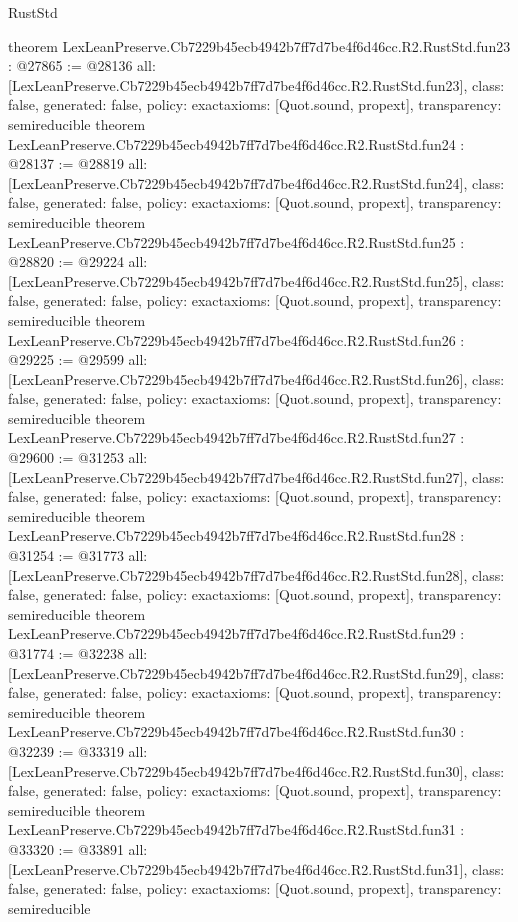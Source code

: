 \begin{lexlean}{RustStd}
\begin{coremodule}
{}
theorem LexLeanPreserve.Cb7229b45ecb4942b7ff7d7be4f6d46cc.R2.RustStd.fun23 : @27865 := @28136 {
  all: [LexLeanPreserve.Cb7229b45ecb4942b7ff7d7be4f6d46cc.R2.RustStd.fun23],
  class: false,
  generated: false,
  policy: exact{axioms: [Quot.sound, propext]},
  transparency: semireducible
}
theorem LexLeanPreserve.Cb7229b45ecb4942b7ff7d7be4f6d46cc.R2.RustStd.fun24 : @28137 := @28819 {
  all: [LexLeanPreserve.Cb7229b45ecb4942b7ff7d7be4f6d46cc.R2.RustStd.fun24],
  class: false,
  generated: false,
  policy: exact{axioms: [Quot.sound, propext]},
  transparency: semireducible
}
theorem LexLeanPreserve.Cb7229b45ecb4942b7ff7d7be4f6d46cc.R2.RustStd.fun25 : @28820 := @29224 {
  all: [LexLeanPreserve.Cb7229b45ecb4942b7ff7d7be4f6d46cc.R2.RustStd.fun25],
  class: false,
  generated: false,
  policy: exact{axioms: [Quot.sound, propext]},
  transparency: semireducible
}
theorem LexLeanPreserve.Cb7229b45ecb4942b7ff7d7be4f6d46cc.R2.RustStd.fun26 : @29225 := @29599 {
  all: [LexLeanPreserve.Cb7229b45ecb4942b7ff7d7be4f6d46cc.R2.RustStd.fun26],
  class: false,
  generated: false,
  policy: exact{axioms: [Quot.sound, propext]},
  transparency: semireducible
}
theorem LexLeanPreserve.Cb7229b45ecb4942b7ff7d7be4f6d46cc.R2.RustStd.fun27 : @29600 := @31253 {
  all: [LexLeanPreserve.Cb7229b45ecb4942b7ff7d7be4f6d46cc.R2.RustStd.fun27],
  class: false,
  generated: false,
  policy: exact{axioms: [Quot.sound, propext]},
  transparency: semireducible
}
theorem LexLeanPreserve.Cb7229b45ecb4942b7ff7d7be4f6d46cc.R2.RustStd.fun28 : @31254 := @31773 {
  all: [LexLeanPreserve.Cb7229b45ecb4942b7ff7d7be4f6d46cc.R2.RustStd.fun28],
  class: false,
  generated: false,
  policy: exact{axioms: [Quot.sound, propext]},
  transparency: semireducible
}
theorem LexLeanPreserve.Cb7229b45ecb4942b7ff7d7be4f6d46cc.R2.RustStd.fun29 : @31774 := @32238 {
  all: [LexLeanPreserve.Cb7229b45ecb4942b7ff7d7be4f6d46cc.R2.RustStd.fun29],
  class: false,
  generated: false,
  policy: exact{axioms: [Quot.sound, propext]},
  transparency: semireducible
}
theorem LexLeanPreserve.Cb7229b45ecb4942b7ff7d7be4f6d46cc.R2.RustStd.fun30 : @32239 := @33319 {
  all: [LexLeanPreserve.Cb7229b45ecb4942b7ff7d7be4f6d46cc.R2.RustStd.fun30],
  class: false,
  generated: false,
  policy: exact{axioms: [Quot.sound, propext]},
  transparency: semireducible
}
theorem LexLeanPreserve.Cb7229b45ecb4942b7ff7d7be4f6d46cc.R2.RustStd.fun31 : @33320 := @33891 {
  all: [LexLeanPreserve.Cb7229b45ecb4942b7ff7d7be4f6d46cc.R2.RustStd.fun31],
  class: false,
  generated: false,
  policy: exact{axioms: [Quot.sound, propext]},
  transparency: semireducible
}
\end{coremodule}
\end{lexlean}
